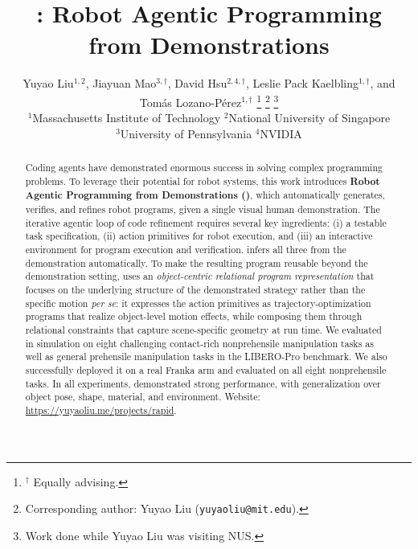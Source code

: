 \documentclass[letterpaper, 10 pt, conference]{ieeeconf}  %
\title{\LARGE \bf
\ours: Robot Agentic Programming from Demonstrations 
}
\author{Yuyao Liu$^{1,2}$, Jiayuan Mao$^{3,\dagger}$, David Hsu$^{2,4,\dagger}$,
Leslie Pack Kaelbling$^{1,\dagger}$, and Tom\'as Lozano-P\'erez$^{1,\dagger}$%
\thanks{$^{\dagger}$ Equally advising.}%
\thanks{Corresponding author: Yuyao Liu (\texttt{yuyaoliu@mit.edu}).}
\thanks{Work done while Yuyao Liu was visiting NUS.}%
\\[0.5ex]
{\normalsize $^{1}$Massachusetts Institute of Technology \quad
$^{2}$National University of Singapore}\\
{\normalsize $^{3}$University of Pennsylvania \quad $^{4}$NVIDIA}
}
\begin{document}
\nocite{IEEEcontrol}

\maketitle
\thispagestyle{empty}
\pagestyle{empty}

\begin{abstract}

Coding agents have demonstrated enormous success in solving complex programming problems. To leverage their potential for robot systems, this work introduces \textbf{Robot Agentic Programming from Demonstrations (\ours)}, which automatically generates, verifies, and refines robot programs, given a \textrm{single visual human demonstration}. The iterative agentic loop of code refinement requires several key ingredients: (i) a testable task specification, (ii) action primitives for robot execution, and (iii) an interactive environment for program execution and verification. \ours infers all three from the demonstration automatically. To make the resulting program reusable beyond the demonstration setting, \ours uses an \textit{object-centric relational program representation} that focuses on the underlying structure of the demonstrated strategy rather than the specific motion \textit{per se}: it expresses the action primitives as trajectory-optimization programs that realize object-level motion effects, while composing them through relational constraints that capture scene-specific geometry at run time.  We evaluated \ours in simulation on eight challenging contact-rich nonprehensile manipulation tasks as well as general prehensile manipulation tasks in the LIBERO-Pro benchmark. We also successfully deployed it on a real Franka arm and evaluated on all eight nonprehensile tasks. In all experiments, \ours demonstrated strong performance, with generalization over object pose, shape, material, and environment. Website: \url{https://yuyaoliu.me/projects/rapid}.
\end{abstract}








% 


% 


\end{document}
